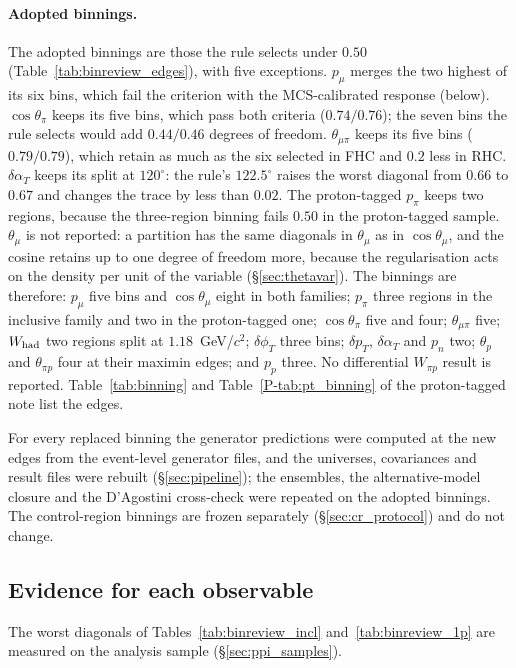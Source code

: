 \documentclass[11pt,a4paper]{article}
\newcommand{\ptref}[2]{#1~\ref{P-#2} of the proton-tagged note}
\begin{document}
\paragraph{Adopted binnings.}
The adopted binnings are those the rule selects under $0.50$ (Table~\ref{tab:binreview_edges}), with
five exceptions. $p_\mu$ merges the two highest of its six bins, which fail the criterion with the
MCS-calibrated response (below). $\cos\theta_\pi$ keeps its five bins, which pass both criteria ($0.74/0.76$); the
seven bins the rule selects would add $0.44/0.46$ degrees of freedom. $\theta_{\mu\pi}$ keeps its
five bins ($0.79/0.79$), which retain as much as the six selected in FHC and $0.2$ less in RHC.
$\delta\alpha_T$ keeps its split at $120^\circ$: the rule's $122.5^\circ$ raises the worst diagonal
from $0.66$ to $0.67$ and changes the trace by less than $0.02$. The proton-tagged $p_\pi$ keeps two
regions, because the three-region binning fails $0.50$ in the proton-tagged sample. $\theta_\mu$ is
not reported: a partition has the same diagonals in $\theta_\mu$ as in $\cos\theta_\mu$, and the
cosine retains up to one degree of freedom more, because the regularisation acts on the density per
unit of the variable (\S\ref{sec:thetavar}). The binnings are therefore: $p_\mu$ five bins and
$\cos\theta_\mu$ eight in both families; $p_\pi$ three regions in the inclusive family and two in the
proton-tagged one; $\cos\theta_\pi$ five and four; $\theta_{\mu\pi}$ five; $W_{\rm had}$ two regions
split at $1.18$~GeV/$c^2$; $\delta\phi_T$ three bins; $\delta p_T$, $\delta\alpha_T$ and $p_n$ two;
$\theta_p$ and $\theta_{\pi p}$ four at their maximin edges; and $p_p$ three. No differential
$W_{\pi p}$ result is reported. Table~\ref{tab:binning} and \ptref{Table}{tab:pt_binning} list the
edges.

For every replaced binning the generator predictions were computed at the new edges from the
event-level generator files, and the universes, covariances and result files were rebuilt
(\S\ref{sec:pipeline}); the ensembles, the alternative-model closure and the D'Agostini cross-check
were repeated on the adopted binnings. The control-region binnings are frozen separately
(\S\ref{sec:cr_protocol}) and do not change.

\subsection{Evidence for each observable}

The worst diagonals of Tables~\ref{tab:binreview_incl} and~\ref{tab:binreview_1p} are measured on the
analysis sample (\S\ref{sec:ppi_samples}).
\end{document}
